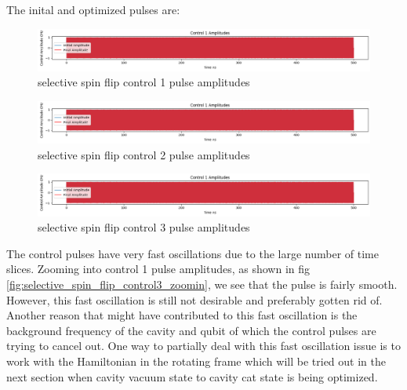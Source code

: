 \documentclass[12pt]{article}
\begin{document}
The inital and optimized pulses are: 
\begin{figure}[H]
    \centering
    \includegraphics[width=0.95\linewidth]{selective_spin_flip_GRAPE_control1.png}
    \caption{selective spin flip control 1 pulse amplitudes}
    \label{fig:selective_spin_flip_control1}
\end{figure}
\begin{figure}[H]
    \centering
    \includegraphics[width=0.95\linewidth]{selective_spin_flip_GRAPE_control1.png}
    \caption{selective spin flip control 2 pulse amplitudes}
    \label{fig:selective_spin_flip_control2}
\end{figure}
\begin{figure}[H]
    \centering
    \includegraphics[width=0.95\linewidth]{selective_spin_flip_GRAPE_control1.png}
    \caption{selective spin flip control 3 pulse amplitudes}
    \label{fig:selective_spin_flip_control3}
\end{figure}

The control pulses have very fast oscillations due to the large number of time slices.
Zooming into control 1 pulse amplitudes, as shown in fig \ref{fig:selective_spin_flip_control3_zoomin},
we see that the pulse is fairly smooth. However, this fast oscillation is still not desirable and preferably gotten rid of. 
Another reason that might have contributed to this fast oscillation is the background frequency of the cavity and qubit 
of which the control pulses are trying to cancel out. One way to partially deal with this fast oscillation issue is to work
with the Hamiltonian in the rotating frame which will be tried out in the next section when cavity vacuum state to cavity cat state
is being optimized.  
\end{document}
